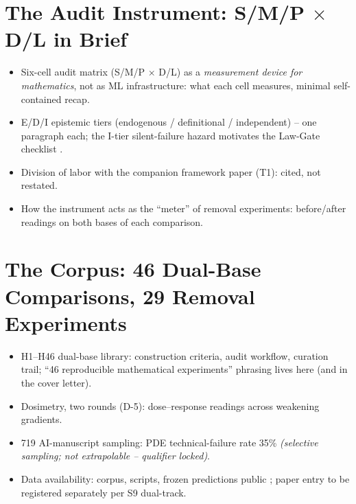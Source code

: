 \documentclass[11pt]{article}
\begin{document}
\section{The Audit Instrument: S/M/P $\times$ D/L in Brief}\label{sec:instrument}
\begin{itemize}
  \item Six-cell audit matrix (S/M/P $\times$ D/L) as a
        \emph{measurement device for mathematics}, not as ML
        infrastructure: what each cell measures, minimal self-contained
        recap.
  \item E/D/I epistemic tiers (endogenous / definitional /
        independent) -- one paragraph each; the I-tier silent-failure
        hazard motivates the Law-Gate checklist
        \citep[cf.][]{corry2004modern}.
  \item Division of labor with the companion framework paper (T1):
        cited, not restated.
  \item How the instrument acts as the ``meter'' of removal experiments:
        before/after readings on both bases of each comparison.
\end{itemize}

\section{The Corpus: 46 Dual-Base Comparisons, 29 Removal Experiments}\label{sec:corpus}
\begin{itemize}
  \item H1--H46 dual-base library: construction criteria, audit
        workflow, curation trail; ``46 reproducible mathematical
        experiments'' phrasing lives here (and in the cover letter).
  \item Dosimetry, two rounds (D-5): dose--response readings across
        weakening gradients.
  \item 719 AI-manuscript sampling: PDE technical-failure rate 35\%
        \emph{(selective sampling; not extrapolable -- qualifier
        locked)}.
  \item Data availability: corpus, scripts, frozen predictions public
        \citep{zenodo2026smpdl, github2026smpdl}; paper entry to be
        registered separately per S9 dual-track.
\end{itemize}
\end{document}
